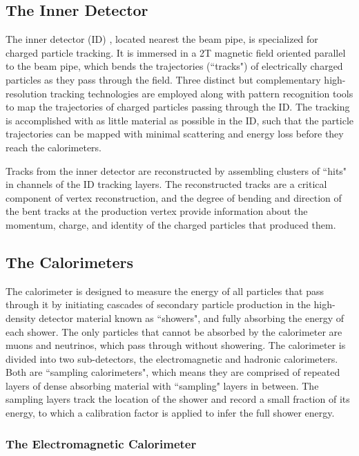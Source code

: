 \subsection{The Inner Detector}
\label{sec:inner_detector}

The inner detector (ID) \cite{id_tdr}, located nearest the beam pipe, is specialized for charged particle tracking. It is immersed in a 2T magnetic field oriented parallel to the beam pipe, which bends the trajectories (``tracks") of electrically charged particles as they pass through the field. Three distinct but complementary high-resolution tracking technologies are employed along with pattern recognition tools to map the trajectories of charged particles passing through the ID. The tracking is accomplished with as little material as possible in the ID, such that the particle trajectories can be mapped with minimal scattering and energy loss before they reach the calorimeters. 

Tracks from the inner detector are reconstructed by assembling clusters of ``hits" in channels of the ID tracking layers. The reconstructed tracks are a critical component of vertex reconstruction, and the degree of bending and direction of the bent tracks at the production vertex provide information about the momentum, charge, and identity of the charged particles that produced them. 

\subsection{The Calorimeters}

The calorimeter is designed to measure the energy of all particles that pass through it by initiating cascades of secondary particle production in the high-density detector material known as ``showers", and fully absorbing the energy of each shower. The only particles that cannot be absorbed by the calorimeter are muons and neutrinos, which pass through without showering. The calorimeter is divided into two sub-detectors, the electromagnetic and hadronic calorimeters. Both are ``sampling calorimeters", which means they are comprised of repeated layers of dense absorbing material with ``sampling" layers in between. The sampling layers track the location of the shower and record a small fraction of its energy, to which a calibration factor is applied to infer the full shower energy. 

\subsubsection{The Electromagnetic Calorimeter}
\label{sec:EM_calo}

